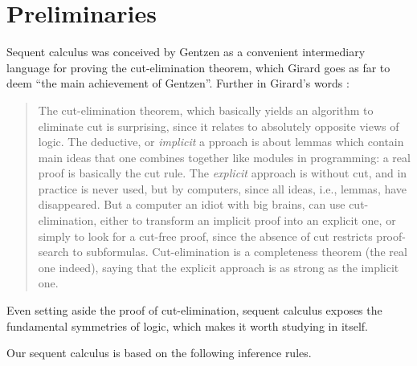 


\maketitle

\section{Preliminaries}

Sequent calculus was conceived by Gentzen as a convenient intermediary language
for proving the cut-elimination theorem, which Girard \cite[pg.
106]{locus-solum} goes as far to deem ``the main achievement of Gentzen''.
Further in Girard's words \cite[pg. 106]{locus-solum}:
\begin{quote}
  The cut-elimination theorem, which basically yields an algorithm to eliminate
  cut is surprising, since it relates to absolutely opposite views of logic.
  The deductive, or \emph{implicit} a pproach is about lemmas which contain
  main ideas that one combines together like modules in programming:
  a real proof is basically the cut rule. The \emph{explicit} approach is
  without cut, and in practice is never used, but by computers, since all
  ideas, i.e., lemmas, have disappeared. But a computer an idiot with big
  brains, can use cut-elimination, either to transform an implicit proof into
  an explicit one, or simply to look for a cut-free proof, since the absence
  of cut restricts proof-search to subformulas. Cut-elimination is a
  completeness theorem (the real one indeed), saying that the explicit
  approach is as strong as the implicit one.
\end{quote}

Even setting aside the proof of cut-elimination, sequent calculus exposes the
fundamental symmetries of logic, which makes it worth studying in itself.

Our sequent calculus is based on the following inference rules.

